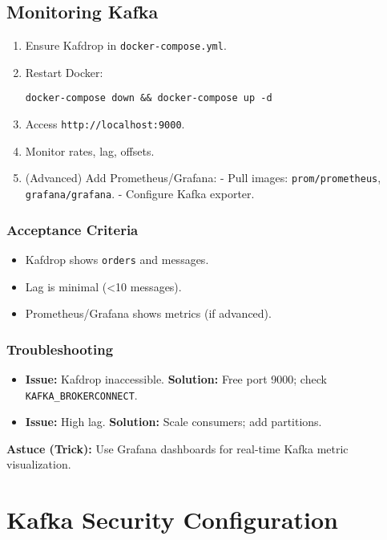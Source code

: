 \documentclass[12pt,a4paper]{report}
\begin{document}
\section{Monitoring Kafka}
\begin{enumerate}
    \item Ensure Kafdrop in \texttt{docker-compose.yml}.
    \item Restart Docker:
    \begin{lstlisting}
docker-compose down && docker-compose up -d
    \end{lstlisting}
    \item Access \texttt{http://localhost:9000}.
    \item Monitor rates, lag, offsets.
    \item (Advanced) Add Prometheus/Grafana:
       - Pull images: \texttt{prom/prometheus}, \texttt{grafana/grafana}.
       - Configure Kafka exporter.
\end{enumerate}

\subsection{Acceptance Criteria}
\begin{itemize}
    \item Kafdrop shows \texttt{orders} and messages.
    \item Lag is minimal (<10 messages).
    \item Prometheus/Grafana shows metrics (if advanced).
\end{itemize}

\subsection{Troubleshooting}
\begin{itemize}
    \item \textbf{Issue:} Kafdrop inaccessible.
      \textbf{Solution:} Free port 9000; check \texttt{KAFKA_BROKERCONNECT}.
    \item \textbf{Issue:} High lag.
      \textbf{Solution:} Scale consumers; add partitions.
\end{itemize}

\begin{framed}
\textbf{Astuce (Trick):} Use Grafana dashboards for real-time Kafka metric visualization.
\end{framed}

\chapter{Kafka Security Configuration}
\end{document}
